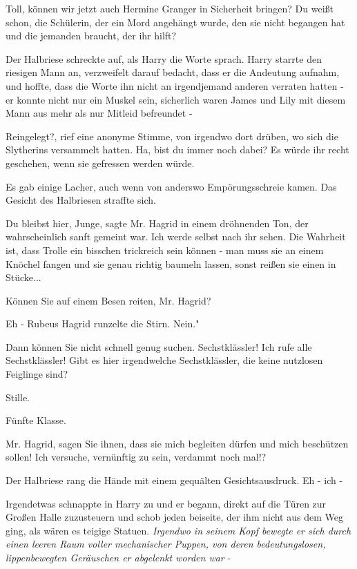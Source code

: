 \glqq{}Toll, können wir jetzt auch Hermine Granger in Sicherheit bringen? Du
weißt schon, die Schülerin, der ein Mord angehängt wurde, den sie nicht begangen
hat und die jemanden braucht, der ihr hilft?\grqq{}

Der Halbriese schreckte auf, als Harry die Worte sprach. Harry starrte den
riesigen Mann an, verzweifelt darauf bedacht, dass er die Andeutung aufnahm, und
hoffte, dass die Worte ihn nicht an irgendjemand anderen verraten hatten - er
konnte nicht nur ein Muskel sein, sicherlich waren James und Lily mit diesem
Mann aus mehr als nur Mitleid befreundet -

\glqq{}Reingelegt?\grqq{}, rief eine anonyme Stimme, von irgendwo dort drüben, wo
sich die Slytherins versammelt hatten. \glqq{}Ha, bist du immer noch dabei? Es
würde ihr recht geschehen, wenn sie gefressen werden würde.\grqq{}

Es gab einige Lacher, auch wenn von anderswo Empörungsschreie kamen. Das Gesicht
des Halbriesen straffte sich.

\glqq{}Du bleibst hier, Junge\grqq{}, sagte Mr. Hagrid in einem dröhnenden Ton,
der wahrscheinlich sanft gemeint war. \glqq{}Ich werde selbst nach ihr sehen. Die
Wahrheit ist, dass Trolle ein bisschen trickreich sein können - man muss sie an
einem Knöchel fangen und sie genau richtig baumeln lassen, sonst reißen sie
einen in Stücke...\grqq{}

\glqq{}Können Sie auf einem Besen reiten, Mr. Hagrid?\grqq{}

\glqq{}Eh -\grqq{} Rubeus Hagrid runzelte die Stirn. \glqq{}Nein."

\glqq{}Dann können Sie nicht schnell genug suchen. Sechstklässler! Ich rufe alle
Sechstklässler! Gibt es hier irgendwelche Sechstklässler, die keine nutzlosen
Feiglinge sind?\grqq{}

Stille.

\glqq{}Fünfte Klasse\grqq{}.

Mr. Hagrid, sagen Sie ihnen, dass sie mich begleiten dürfen und mich beschützen
sollen! Ich versuche, vernünftig zu sein, verdammt noch mal!?\grqq{}

Der Halbriese rang die Hände mit einem gequälten Gesichtsausdruck. \glqq{}Eh -
ich -\grqq{}

Irgendetwas schnappte in Harry zu und er begann, direkt auf die Türen zur Großen
Halle zuzusteuern und schob jeden beiseite, der ihm nicht aus dem Weg ging, als
wären es teigige Statuen. \emph{Irgendwo in seinem Kopf bewegte er sich durch
einen leeren Raum voller mechanischer Puppen, von deren bedeutungslosen,
lippenbewegten Geräuschen er abgelenkt worden war} -

